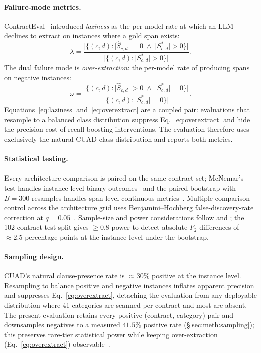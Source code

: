 \paragraph{Failure-mode metrics.}
ContractEval~\cite{liu2025contracteval} introduced \emph{laziness} as the per-model
rate at which an LLM declines to extract on instances where a gold span exists:
%
\begin{equation}\label{eq:laziness}
  \lambda = \frac{|\{(c,d): |\hat{S}_{c,d}|=0 \;\wedge\; |S^*_{c,d}|>0\}|}
                 {|\{(c,d): |S^*_{c,d}|>0\}|}.
\end{equation}
%
The dual failure mode is \emph{over-extraction}: the per-model rate of producing
spans on negative instances:
%
\begin{equation}\label{eq:overextract}
  \omega = \frac{|\{(c,d): |\hat{S}_{c,d}|>0 \;\wedge\; |S^*_{c,d}|=0\}|}
                {|\{(c,d): |S^*_{c,d}|=0\}|}.
\end{equation}
%
Equations~\eqref{eq:laziness} and~\eqref{eq:overextract} are a coupled pair:
evaluations that resample to a balanced class distribution suppress
Eq.~\eqref{eq:overextract} and hide the precision cost of recall-boosting
interventions. The evaluation therefore uses exclusively the natural CUAD class
distribution and reports both metrics.

\paragraph{Statistical testing.}
Every architecture comparison is paired on the same contract set; McNemar's test
handles instance-level binary outcomes~\cite{mcnemar1947note} and the paired bootstrap
with $B{=}300$ resamples handles span-level continuous
metrics~\cite{efron1979bootstrap,riezler2005pitfalls}. Multiple-comparison control
across the architecture grid uses Benjamini--Hochberg false-discovery-rate correction
at $q{=}0.05$~\cite{benjamini1995controlling}. Sample-size and power considerations
follow \textcite{dror2018hitchhikers} and \textcite{card2020little};
the 102-contract test split gives $\geq 0.8$ power to detect absolute $F_2$
differences of $\approx\!2.5$ percentage points at the instance level under the
bootstrap.

\paragraph{Sampling design.}
CUAD's natural clause-presence rate is $\approx\!30\%$ positive at the instance level.
Resampling to balance positive and negative instances inflates apparent precision and
suppresses Eq.~\eqref{eq:overextract}, detaching the evaluation from any deployable
distribution where 41 categories are scanned per contract and most are absent. The
present evaluation retains every positive (contract, category) pair and downsamples
negatives to a measured $41.5\%$ positive rate (\S\ref{sec:meth:sampling}); this
preserves rare-tier statistical power while keeping over-extraction
(Eq.~\eqref{eq:overextract}) observable~\cite{liu2025contracteval}.

